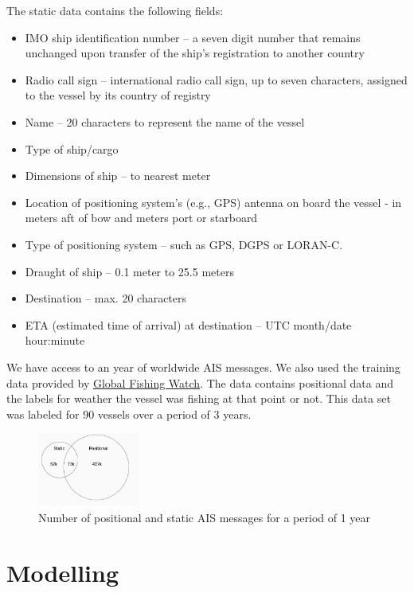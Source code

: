 The static data contains the following fields:

\begin{itemize}
\item IMO ship identification number – a seven digit number that remains unchanged upon transfer of the ship's registration to another country
\item Radio call sign – international radio call sign, up to seven characters, assigned to the vessel by its country of registry
\item Name – 20 characters to represent the name of the vessel
\item Type of ship/cargo
\item Dimensions of ship – to nearest meter
\item Location of positioning system's (e.g., GPS) antenna on board the vessel - in meters aft of bow and meters port or starboard
\item Type of positioning system – such as GPS, DGPS or LORAN-C.
\item Draught of ship – 0.1 meter to 25.5 meters
\item Destination – max. 20 characters
\item ETA (estimated time of arrival) at destination – UTC month/date hour:minute
\end{itemize}

We have access to an year of worldwide AIS messages. We also used the training data provided by \href{globalfishingwatch.github.io}{Global Fishing Watch}. The data contains positional data and the labels for weather the vessel was fishing at that point or not. This data set was labeled for 90 vessels over a period of 3 years.

\begin{figure}[H]
\centering
\includegraphics[width=0.3\textwidth]{images/ais_summary.png}
\caption{\label{fig:AIS broadcast summary}Number of positional and static AIS messages for a period of 1 year}
\end{figure}

\section{Modelling}

